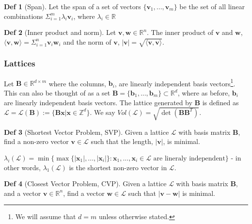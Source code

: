 \documentclass[a4paper, 10pt]{article}
\theoremstyle{definition}
\newtheorem{definition}{Def}[section]
\begin{document}
\begin{definition}[Span]
    Let the span of a set of vectors $\{\textbf{v}_1,...,\textbf{v}_m\}$ be the set of all linear combinations $\Sigma_{i=1}^m \lambda _i \mathbf{v}_i$, where $\lambda _i \in \mathbb{R}$
\end{definition}

\begin{definition}[Inner product and norm]
    Let $\mathbf{v}, \mathbf{w} \in \mathbb{R}^n$. The inner product of $\mathbf{v}$ and $\mathbf{w}$, $\langle \mathbf{v}, \mathbf{w} \rangle = \Sigma_{i=1}^n \mathbf{v}_i \mathbf{w}_i$ and the norm of $\mathbf{v}$, $|\mathbf{v}| = \sqrt{\langle \mathbf{v}, \mathbf{v} \rangle}$.
\end{definition}

\subsubsection{Lattices}

Let $\mathbf{B} \in \mathbb{R} ^{d\times m}$ where the columns, $\mathbf{b}_i$, are linearly independent basis vectors\footnote{We will assume that $d=m$ unless otherwise stated.}. This can also be thought of as a set $\mathbf{B}=\{\mathbf{b}_1,...,\mathbf{b}_m\}\subset \mathbb{R} ^d$, where as before, $\mathbf{b}_i$ are linearly independent basis vectors. The lattice generated by $\mathbf{B}$ is defined as $\mathcal{L} = \mathcal{L} (\mathbf{B}) := \{\mathbf{B} \mathbf{x} | \mathbf{x} \in \mathbb{Z} ^d\}$. We say $Vol(\mathcal{L}) = \sqrt{\det(\mathbf{B} \mathbf{B}^T)}$.


\begin{definition}[Shortest Vector Problem, SVP]
    Given a lattice $\mathcal{L}$ with basis matrix $\textbf{B}$, find a non-zero vector $\mathbf{v} \in \mathcal{L}$ such that the length, $|\mathbf{v}|$, is minimal.

    $\lambda_i(\mathcal{L})=\min \{\max \{|\mathbf{x}_1|,...,|\mathbf{x}_i|\} : \mathbf{x}_1,...,\mathbf{x}_i \in \mathcal{L} \mbox{ are lineraly independent}\}$ - in other words, $\lambda_1(\mathcal{L})$ is the shortest non-zero vector in $\mathcal{L}$.
\end{definition}

\begin{definition}[Closest Vector Problem, CVP]
    Given a lattice $\mathcal{L}$ with basis matrix $\textbf{B}$, and a vector $\mathbf{v} \in \mathbb{R}^n$, find a vector $\mathbf{w} \in \mathcal{L}$ such that $|\mathbf{v} - \mathbf{w}|$ is minimal.
\end{definition}
\end{document}
